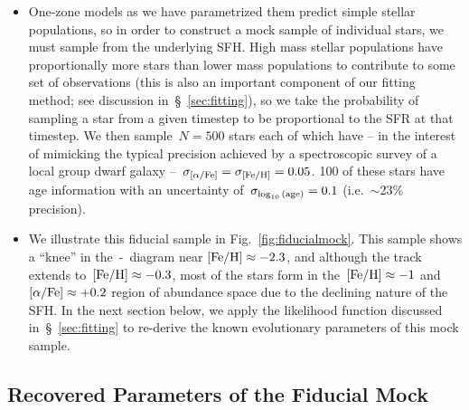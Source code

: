 \documentclass[ms.tex]{subfiles}
\begin{document}
\begin{itemize}
	\item One-zone models as we have parametrized them predict simple stellar
	populations, so in order to construct a mock sample of individual stars, we
	must sample from the underlying SFH.
	High mass stellar populations have proportionally more stars than lower
	mass populations to contribute to some set of observations (this is also
	an important component of our fitting method; see discussion
	in~\S~\ref{sec:fitting}), so we take the probability of sampling a star
	from a given timestep to be proportional to the SFR at that timestep.
	We then sample~$N = 500$ stars each of which have -- in the interest of
	mimicking the typical precision achieved by a spectroscopic survey of a
	local group dwarf galaxy --~$\sigma_{\text{[$\alpha$/Fe]}} = \sigma_{\text{[Fe/H]}} = 0.05$.
	100 of these stars have age information with an uncertainty
	of~$\sigma_{\log_{10}\text{(age)}} = 0.1$ (i.e.~$\sim$23\% precision).

	\item We illustrate this fiducial sample in Fig.~\ref{fig:fiducialmock}.
	This sample shows a ``knee'' in the~\afe-\feh~diagram near
	$\text{[Fe/H]} \approx -2.3$, and although the track extends to~$\text{[Fe/H]} \approx -0.3$,
	most of the stars form in the~$\text{[Fe/H]} \approx -1$ and~$\text{[$\alpha$/Fe]} \approx +0.2$
	region of abundance space due to the declining nature of the SFH.
	In the next section below, we apply the likelihood function discussed
	in~\S~\ref{sec:fitting} to re-derive the known evolutionary parameters of
	this mock sample.

\end{itemize}

\subsection{Recovered Parameters of the Fiducial Mock}
\label{sec:mocks:fiducial_fit}
\end{document}
